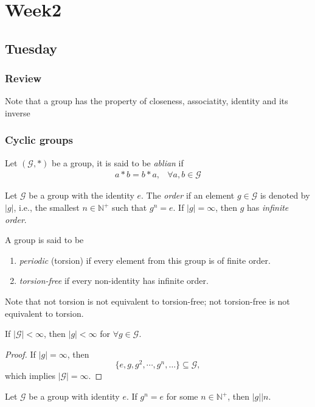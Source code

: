 \chapter{Week2}
\section{Tuesday}
\subsection{Review}
Note that a group has the property of closeness, associatity, identity and its inverse
\subsection{Cyclic groups}
\begin{definition}[Ablian]
Let $(\mathcal{G},*)$ be a group, it is said to be \emph{ablian} if 
\[
\begin{array}{ll}
a*b = b*a,
&
\forall a,b\in\mathcal{G}
\end{array}
\]
\end{definition}
\begin{definition}[Order]
Let $\mathcal{G}$ be a group with the identity $e$. The \emph{order} if an element $g\in\mathcal{G}$ is denoted by $|g|$, i.e., the smallest $n\in\mathbb{N}^+$ such that $g^n=e$. If $|g|=\infty$, then $g$ has \emph{infinite order}.
\end{definition}
\begin{definition}
A group is said to be 
\begin{enumerate}
\item
\emph{periodic} (torsion) if every element from this group is of finite order.
\item
\emph{torsion-free} if every non-identity has infinite order.
\end{enumerate}
\end{definition}
Note that not torsion is not equivalent to torsion-free; not torsion-free is not equivalent to torsion.
\begin{proposition}
If $|\mathcal{G}|<\infty$, then $|g|<\infty$ for $\forall g\in\mathcal{G}$.
\end{proposition}
\begin{proof}
If $|g|=\infty$, then
\[
\{e,g,g^2,\cdots,g^n,\dots\}\subseteq\mathcal{G},
\]
which implies $|\mathcal{G}|=\infty$.
\end{proof}
\begin{proposition}
Let $\mathcal{G}$ be a group with identity $e$. If $g^n=e$ for some $n\in\mathbb{N}^+$, then $|g||n$.
\end{proposition}
